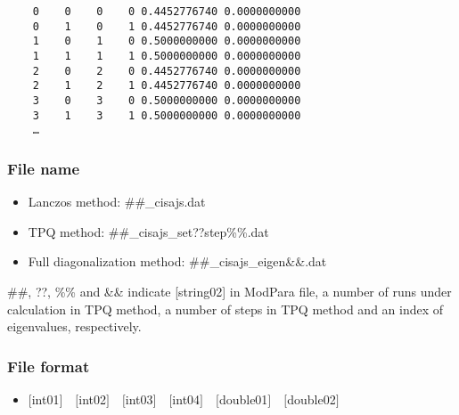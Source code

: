 \begin{minipage}{12.5cm}
\begin{screen}
\begin{verbatim}
    0    0    0    0 0.4452776740 0.0000000000
    0    1    0    1 0.4452776740 0.0000000000
    1    0    1    0 0.5000000000 0.0000000000
    1    1    1    1 0.5000000000 0.0000000000
    2    0    2    0 0.4452776740 0.0000000000
    2    1    2    1 0.4452776740 0.0000000000
    3    0    3    0 0.5000000000 0.0000000000
    3    1    3    1 0.5000000000 0.0000000000
    …
\end{verbatim}
\end{screen}
\end{minipage}

\subsubsection{File name}
 \begin{itemize}
   \item{Lanczos method:}  \#\#\_cisajs.dat
   \item{TPQ method:} \#\#\_cisajs\_set??step\%\%.dat
   \item{Full diagonalization method:}  \#\#\_cisajs\_eigen{\&\&}.dat
  \end{itemize}
  \#\#, ??, \%\% and \&\& indicate [string02] in ModPara file, a number of runs under calculation in TPQ method, a number of steps in TPQ method and an index of eigenvalues, respectively.


\subsubsection{File format}
 \begin{itemize}
   \item  $[$int01$]$~~$[$int02$]$~~$[$int03$]$~~$[$int04$]$~~$[$double01$]$~~$[$double02$]$
  \end{itemize}
